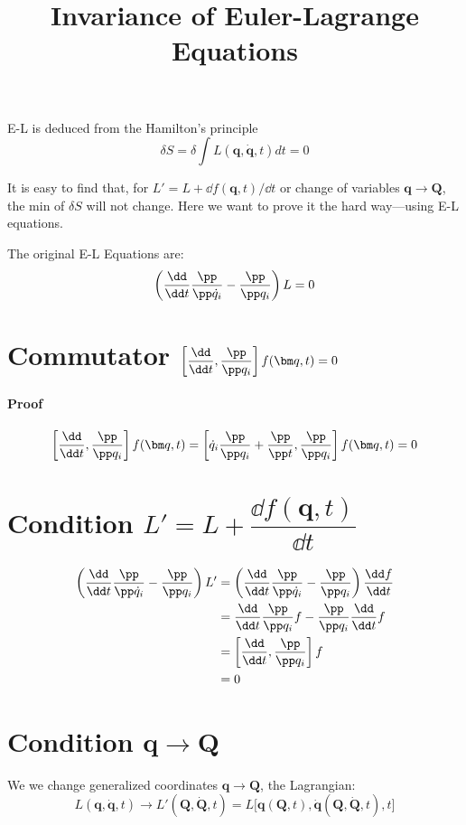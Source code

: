 \documentclass[12pt]{article}
\title{Invariance of Euler-Lagrange Equations}
\author{\zpj}
\begin{document}
\maketitle

E-L is deduced from the Hamilton's principle \[\delta S=\delta\int L(\bm q, \dot{\bm q}, t)dt=0\]

It is easy to find that, for $L'=L+\dd f(\bm q, t)/\dd t$ or change of variables $\bm q\to\bm Q$, the min of $\delta S$ will not change. Here we want to prove it the hard way---using E-L equations. 

The original E-L Equations are:
\[\left(\frac{\dd}{\dd t}\frac{\pp}{\pp \dot q_i}-\frac{\pp}{\pp q_i}\right)L=0\]

\section{Commutator $\left [\dfrac{\dd}{\dd t}, \dfrac{\pp}{\pp q_i}\right ]f(\bm q, t)=0$}

\paragraph{Proof}
\[
\left[\frac{\dd}{\dd t},\frac{\pp}{\pp q_i}\right]f(\bm q, t) = \left[\dot q_i\frac{\pp}{\pp q_i}+\frac{\pp}{\pp t},\frac{\pp}{\pp q_i}\right]f(\bm q, t)=0
\]

\section{Condition $L'=L+\dfrac{\dd f(\bm q, t)}{\dd t}$}
\begin{align}
\left(\frac{\dd}{\dd t}\frac{\pp}{\pp \dot q_i}-\frac{\pp}{\pp q_i}\right)L'
&=\left(\frac{\dd}{\dd t}\frac{\pp}{\pp \dot q_i}-\frac{\pp}{\pp q_i}\right)\frac{\dd f}{\dd t}\\
&=\frac{\dd}{\dd t}\frac{\pp}{\pp q_i}f-\frac{\pp}{\pp q_i}\frac{\dd}{\dd t}f\\
&=\left[\frac{\dd}{\dd t},\frac{\pp}{\pp q_i}\right]f\\
&=0
\end{align}

\section{Condition $\bm q\to\bm Q$}
We we change generalized coordinates $\bm q\to\bm Q$, the Lagrangian:
\[L(\bm q, \dot{\bm q}, t)\to L'(\bm Q, \dot{\bm Q}, t)=L\big[\bm q(\bm Q, t), \dot{\bm q}(\bm Q, \dot{\bm Q}, t), t\big]\]
\end{document}
